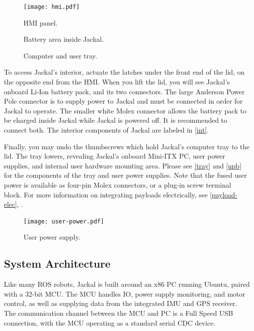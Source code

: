 \documentclass[]{clearpath-latex/clearpath-manual}
\begin{document}
\begin{figure}[ht]
  \centering
  \texttt{[image: hmi.pdf]}
  \caption{HMI panel.}
  \label{hmi}
\end{figure}


\begin{figure}[pt]
  \centering
  \def\svgwidth{12cm}
  
  \caption{Battery area inside Jackal.}
  \label{int}
\end{figure}

\begin{figure}[pb]
  \centering
  \def\svgwidth{14cm}
  
  \caption{Computer and user tray.}
  \label{tray}
\end{figure}

To access Jackal's interior, actuate the latches under the front end of the lid, on the opposite end from
the HMI. When you lift the lid, you will see Jackal's onboard Li-Ion battery pack, and its two connectors.
The large Anderson Power Pole connector is to supply power to Jackal and must be connected in order for
Jackal to operate. The smaller white Molex connector allows the battery pack to be charged inside Jackal
while Jackal is powered off. It is recommended to connect both. The interior components of Jackal are
labeled in \autoref{int}.

Finally, you may undo the thumbscrews which hold Jackal's computer tray to the lid. The tray lowers,
revealing Jackal's onboard Mini-ITX PC, user power supplies, and internal user hardware mounting area.
Please see \autoref{tray} and \autoref{upb} for the components of the tray and user power supplies.
Note that the fused user power is available as four-pin Molex connectors, or a plug-in screw terminal
block. For more information on integrating payloads electrically, see \autoref{payload-elec},
.


\begin{figure}[hb]
  \centering
  \texttt{[image: user-power.pdf]}
  \caption{User power supply.}
  \label{upb}
\end{figure}


\subsection{System Architecture}

Like many ROS robots, Jackal is built around an x86 PC running Ubuntu, paired with a
32-bit MCU. The MCU handles IO, power supply monitoring, and motor control, as well as
supplying data from the integrated IMU and GPS receiver. The communication channel
between the MCU and PC is a Full Speed USB connection, with the MCU operating as a
standard serial CDC device.
\end{document}
